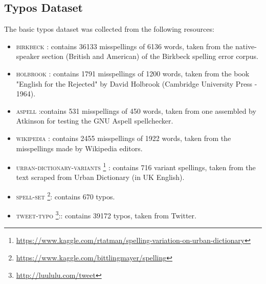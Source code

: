 \subsection{Typos Dataset}
The basic typos dataset was collected from the following resources:
\begin{itemize}
	\item \textsc{birkbeck}  : contains 
	\num{36133} misspellings of \num{6136} words, taken from the native-speaker section (British and 
	American) of the Birkbeck spelling error corpus.
	\item \textsc{holbrook} : contains \num{1791} misspellings of \num{1200} words, taken from 
	the book "English for the Rejected" by David Holbrook (Cambridge University Press - 1964).
	\item \textsc{aspell}  :contains \num{531} misspellings of \num{450} words, taken from one 
	assembled by Atkinson for testing the GNU Aspell spellchecker.
	\item \textsc{wikipedia} : contains \num{2455} misspellings of \num{1922} words, taken from 
	the misspellings made by Wikipedia editors.
	\item \textsc{urban-dictionary-variants} 
	\footnote{\url{https://www.kaggle.com/rtatman/spelling-variation-on-urban-dictionary}}  : contains 
	\num{716} variant 
	spellings, taken from the text scraped from Urban Dictionary (in UK English).
	\item \textsc{spell-set} \footnote{\url{https://www.kaggle.com/bittlingmayer/spelling}}: contains 
	\num{670} typos.
	\item \textsc{tweet-typo} \footnote{\url{http://luululu.com/tweet}}:: contains \num{39172} typos, taken 
	from Twitter.
\end{itemize}

